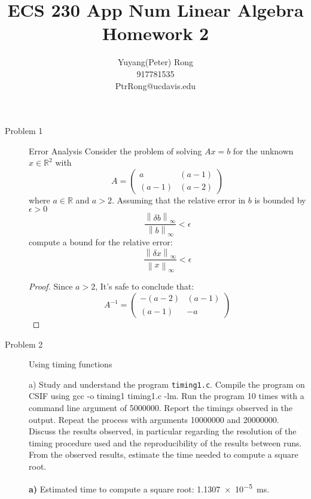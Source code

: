 \documentclass{article}
\title{ECS 230 App Num Linear Algebra \\ Homework 2}
\author{Yuyang(Peter) Rong \\917781535 \\ PtrRong@ucdavis.edu}
\newcommand{\norm}[1]{\left\lVert#1\right\rVert}
\begin{document}
\maketitle

\begin{description}
	\item[Problem 1] Error Analysis
	      Consider the problem of solving $Ax = b$ for the unknown $x \in \mathbb{R}^2$ with
	      \begin{equation}
		      A = \begin{pmatrix} a & (a-1) \\ (a-1) & (a-2)\end{pmatrix}
	      \end{equation}
	      where $a \in \mathbb{R}$ and $a > 2$. Assuming that the relative error in $b$ is bounded by $\epsilon > 0$
	      \begin{equation}
		      \frac{\norm{\delta b}_\infty}{\norm{b}_\infty} < \epsilon
	      \end{equation}
	      compute a bound for the relative error:
	      \begin{equation}
		      \frac{\norm{\delta x}_\infty}{\norm{x}_\infty} < \epsilon
	      \end{equation}

	      \begin{proof}
		      Since $a > 2$, It's safe to conclude that:
		      $$
			      A^{-1} = \begin{pmatrix} -(a-2) & (a-1) \\ (a-1) & -a\end{pmatrix}
		      $$
	      \end{proof}

	\item[Problem 2] Using timing functions

	      a) Study and understand the program \lstinline{timing1.c}.
	      Compile the program on CSIF using gcc -o timing1 timing1.c -lm.
	      Run the program 10 times with a command line argument of 5000000. Report the timings observed in the output. Repeat the process with arguments 10000000 and 20000000.
	      Discuss the results observed, in particular regarding the resolution of the timing procedure used and the reproducibility of the results between runs. From the observed results,
	      estimate the time needed to compute a square root.

	      \textbf{a)}
	      Estimated time to compute a square root: \SI{1.1307e-5}{\milli\second}.


\end{description}
\end{document}
